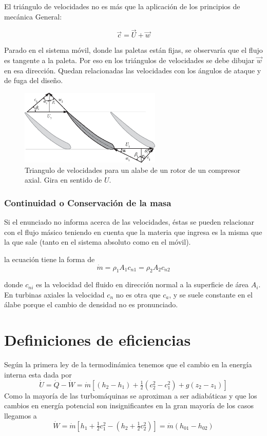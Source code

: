 \documentclass{article}
\newcommand{\dQ}{\dot{Q}}
\newcommand{\dW}{\dot{W}}
\newcommand{\dm}{\dot{m}}
\begin{document}
El triángulo de velocidades no es más que la aplicación de los principios de mecánica General: 

\[\Vec{c}=\Vec{U}+\Vec{w}\]

Parado en el sistema móvil, donde las paletas están fijas, se observaría que el flujo es tangente a la paleta. Por eso en los triángulos de velocidades se debe dibujar $\Vec{w}$ en esa dirección. Quedan relacionadas las velocidades con los ángulos de ataque y de fuga del diseño.

\begin{figure}[htb!]
    \centering
    \includegraphics[width=0.6\textwidth]{fig/VelTrianglegeneral.eps}
    \caption{Triangulo de velocidades para un alabe de un rotor de un compresor axial. Gira en sentido de $U$.}
    \label{fig:veltrianggeneral}
\end{figure}

\subsubsection*{Continuidad o Conservación de la masa}
Si el enunciado no informa acerca de las velocidades, éstas se pueden relacionar con el flujo másico teniendo en cuenta que la materia que ingresa es la misma que la que sale (tanto en el sistema absoluto como en el móvil).

la ecuación tiene la forma de 
\[
\dm=\rho_1 A_1 c_{n1} = \rho_2 A_2 c_{n2}
\]

donde $c_{ni}$ es la velocidad del fluido en dirección normal a la superficie de área $A_i$. En turbinas axiales la velocidad $c_{n}$ no es otra que $c_{a}$, y se suele constante en el álabe porque el cambio de densidad no es pronunciado. 







\section{Definiciones de eficiencias}
Según la primera ley de la termodinámica tenemos que el cambio en la energía interna esta dada por
\begin{equation}
    \dot{U} =\dQ -\dW = \dm \left[(h_2-h_1)+\tfrac{1}{2}(c_2^2-c_1^2)+g(z_2-z_1) \right]
\end{equation}
Como la mayoría de las turbomáquinas se aproximan a ser adiabáticas y que los cambios en energía potencial son insignificantes en la gran mayoría de los casos llegamos a
\begin{equation}
    \dW = \dm \left[ h_1+\tfrac{1}{2}c_1^2 - (h_2+\tfrac{1}{2}c_2^2) \right] = \dm \left( h_{01}-h_{02}\right)
\end{equation}
\end{document}
